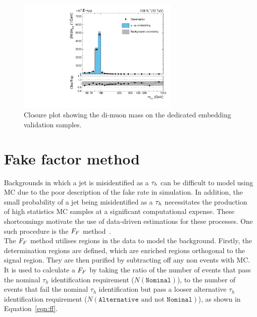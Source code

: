 \begin{figure}[!hbtp]
\centering
    \includegraphics[width=0.7\textwidth]{Figures/embedding_validation.pdf}
\caption[Plot of the validation of the embedding method.]{Closure plot showing the di-muon mass on the dedicated embedding validation samples.}
\label{fig:emb_validation}
\end{figure}

\section{Fake factor method}
\label{sec:ff}

Backgrounds in which a jet is misidentified as a $\tau_{h}$ can be difficult to model using \ac{MC} due to the poor description of the \jtth fake rate in simulation. 
In addition, the small probability of a jet being misidentified as a $\tau_{h}$ necessitates the production of high statistics \ac{MC} samples at a significant computational expense.
These shortcomings motivate the use of data-driven estimations for these processes. 
One such procedure is the $F_{F}$ method~\cite{Sirunyan:2018zut,CMS:2018lkr}. \\

The $F_{F}$ method utilises regions in the data to model the \jtth background. 
Firstly, the determination regions are defined, which are \jtth enriched regions orthogonal to the signal region. 
They are then purified by subtracting off any non \jtth events with \ac{MC}.
It is used to calculate a $F_{F}$ by taking the ratio of the number of \jtth events that pass the nominal $\tau_h$ identification requirement ($N(\texttt{Nominal})$), to the number of \jtth events that fail the nominal $\tau_h$ identification but pass a looser alternative $\tau_h$ identification requirement ($N(\texttt{Alternative}\text{ and not }\texttt{Nominal})$), as shown in Equation~\ref{eqn:ff}.

